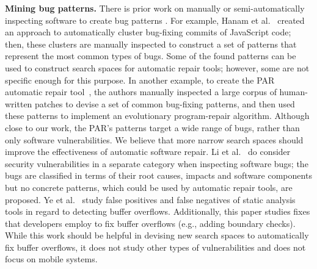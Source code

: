 \textbf{Mining bug patterns.} There is prior work on manually or semi-automatically inspecting software to create bug patterns \cite{hanam2016discovering, kim2013automatic,ye2016empirical,li2006have}.
For example, Hanam et al.~\cite{hanam2016discovering} created an approach to automatically cluster bug-fixing commits of JavaScript code; then, these clusters are manually inspected to construct a set of patterns that represent the most common types of bugs.
Some of the found patterns can be used to construct search spaces for automatic repair tools; however, some are not specific enough for this purpose. 
In another example, to create the PAR automatic repair tool~\cite{kim2013automatic}, the authors manually inspected a large corpus of human-written patches to devise a set of common bug-fixing patterns, and then used these patterns to implement an evolutionary program-repair algorithm.
Although close to our work, the PAR's patterns target a wide range of bugs, rather than only software vulnerabilities.
We believe that more narrow search spaces should improve the effectiveness of automatic software repair.
Li et al.~\cite{li2006have} do consider security vulnerabilities in a separate category when inspecting software bugs; the bugs are classified in terms of their root causes, impacts and software components but no concrete patterns, which could be used by automatic repair tools, are proposed.
Ye et al.~\cite{ye2016empirical} study false positives and false negatives of static analysis tools in regard to detecting buffer overflows.
Additionally, this paper studies fixes that developers employ to fix buffer overflows (e.g., adding boundary checks).
While this work should be helpful in devising new search spaces to automatically fix buffer overflows, it does not study other types of vulnerabilities and does not focus on mobile systems.

